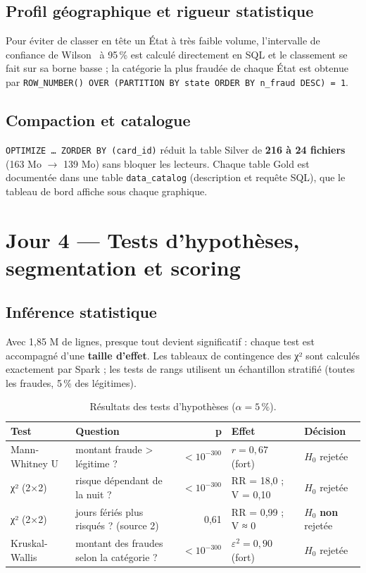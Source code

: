 \documentclass[11pt,a4paper]{article}
\newcommand{\code}[1]{\texttt{\small #1}}
\begin{document}
\subsection{Profil géographique et rigueur statistique}
Pour éviter de classer en tête un État à très faible volume, l'intervalle de confiance de Wilson~\cite{wilson1927} à 95\,\% est calculé directement en
SQL et le classement se fait sur sa borne basse ; la catégorie la plus fraudée de chaque État est obtenue par
\code{ROW\_NUMBER() OVER (PARTITION BY state ORDER BY n\_fraud DESC) = 1}.

\subsection{Compaction et catalogue}
\code{OPTIMIZE … ZORDER BY (card\_id)} réduit la table Silver de \textbf{216 à 24 fichiers} (163 Mo $\to$ 139 Mo) sans bloquer les
lecteurs. Chaque table Gold est documentée dans une table \code{data\_catalog} (description et requête SQL), que le tableau de bord
affiche sous chaque graphique.

\section{Jour 4 — Tests d'hypothèses, segmentation et scoring}\label{sec:j4}

\subsection{Inférence statistique}\label{sec:tests}
Avec 1,85 M de lignes, presque tout devient significatif : chaque test est accompagné d'une \textbf{taille d'effet}. Les tableaux de
contingence des χ² sont calculés exactement par Spark ; les tests de rangs utilisent un échantillon stratifié (toutes les fraudes,
5\,\% des légitimes).

\begin{table}[H]
\centering\small
\begin{tabularx}{\linewidth}{@{}l Y r l l@{}}
\toprule
\textbf{Test} & \textbf{Question} & \textbf{p} & \textbf{Effet} & \textbf{Décision} \\ \midrule
Mann-Whitney U~\cite{mann1947} & montant fraude > légitime ? & $<10^{-300}$ & $r = 0{,}67$ (fort) & $H_0$ rejetée \\
χ² (2×2) & risque dépendant de la nuit ? & $<10^{-300}$ & RR = 18,0 ; V = 0,10 & $H_0$ rejetée \\
χ² (2×2) & jours fériés plus risqués ? (source 2) & 0,61 & RR = 0,99 ; V ≈ 0 & $H_0$ \textbf{non} rejetée \\
Kruskal-Wallis~\cite{kruskal1952} & montant des fraudes selon la catégorie ? & $<10^{-300}$ & $\varepsilon^2 = 0{,}90$ (fort) & $H_0$ rejetée \\
\bottomrule
\end{tabularx}
\caption{Résultats des tests d'hypothèses ($\alpha = 5\,\%$).}
\end{table}
\end{document}
